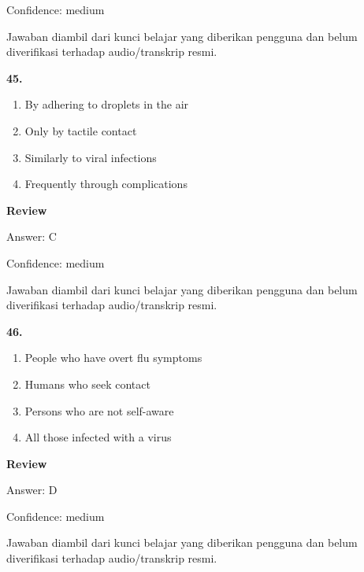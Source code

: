\documentclass[12pt]{article}
\begin{document}
Confidence: medium\par
Jawaban diambil dari kunci belajar yang diberikan pengguna dan belum diverifikasi terhadap audio/transkrip resmi.\par
\endgroup
\par
\vspace{0.25\baselineskip}
\noindent\textbf{45.}
\begin{enumerate}[label=(\Alph*),leftmargin=*,itemsep=0.2em]
\item By adhering to droplets in the air
\item Only by tactile contact
\item Similarly to viral infections
\item Frequently through complications
\end{enumerate}
\par
\begingroup
\setlength{\parskip}{0pt}
\setlength{\parindent}{0pt}
\textbf{Review}\par
Answer: C\par
Confidence: medium\par
Jawaban diambil dari kunci belajar yang diberikan pengguna dan belum diverifikasi terhadap audio/transkrip resmi.\par
\endgroup
\par
\vspace{0.25\baselineskip}
\noindent\textbf{46.}
\begin{enumerate}[label=(\Alph*),leftmargin=*,itemsep=0.2em]
\item People who have overt flu symptoms
\item Humans who seek contact
\item Persons who are not self-aware
\item All those infected with a virus
\end{enumerate}
\par
\begingroup
\setlength{\parskip}{0pt}
\setlength{\parindent}{0pt}
\textbf{Review}\par
Answer: D\par
Confidence: medium\par
Jawaban diambil dari kunci belajar yang diberikan pengguna dan belum diverifikasi terhadap audio/transkrip resmi.\par
\endgroup
\par
\vspace{0.25\baselineskip}
\end{document}
